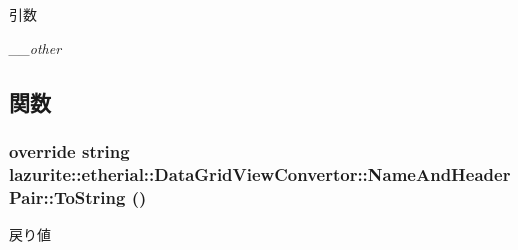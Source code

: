 \begin{DoxyParams}{引数}
\item[{\em \_\-\_\-other}]\end{DoxyParams}


\subsection{関数}
\hypertarget{classlazurite_1_1etherial_1_1_data_grid_view_convertor_1_1_name_and_header_pair_a09da40d12bb28301b6f183a9879e3773}{
\subsubsection[{ToString}]{\setlength{\rightskip}{0pt plus 5cm}override string lazurite::etherial::DataGridViewConvertor::NameAndHeaderPair::ToString ()}}
\label{classlazurite_1_1etherial_1_1_data_grid_view_convertor_1_1_name_and_header_pair_a09da40d12bb28301b6f183a9879e3773}
\begin{DoxyReturn}{戻り値}

\end{DoxyReturn}


